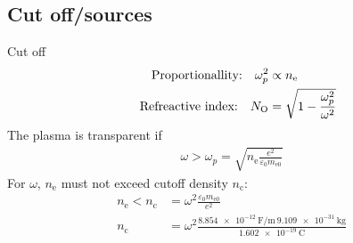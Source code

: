 \documentclass[hyperref={colorlinks=true,urlcolor=blue,linkcolor=.},aspectratio=1610,mathserif]{beamer}
\begin{document}
\subsection{Cut off/sources}
\begin{frame}{Cut off}
	\centering
	\begin{align}
		\qq{Proportionallity:} \omega_p^2    & \propto n_\mathrm{e}                   \\
		\qq{Refreactive index:} N_\mathrm{O} & = \sqrt{1-\frac{\omega_p^2}{\omega^2}}
	\end{align}
	The plasma is transparent if
	\begin{align}
		\omega > \omega_p = \sqrt{n_\mathrm{e}\frac{e^2}{\varepsilon_0m_\mathrm{e0}}}
	\end{align}
	For \(\omega\), \(n_\mathrm{e}\) must not exceed cutoff density \(n_\mathrm{c}\):
	\begin{align}
		n_\mathrm{e} < n_\mathrm{c} & = \omega^2\frac{\varepsilon_0m_\mathrm{e0}}{e^2}                                                        \\
		n_\mathrm{c}                & = \omega^2\frac{\SI{8.854e-12}{\farad\per\meter}\ \SI{9.109e-31}{\kilo\gram}}{\SI{1.602e-19}{\coulomb}}
	\end{align}
\end{frame}
\end{document}

